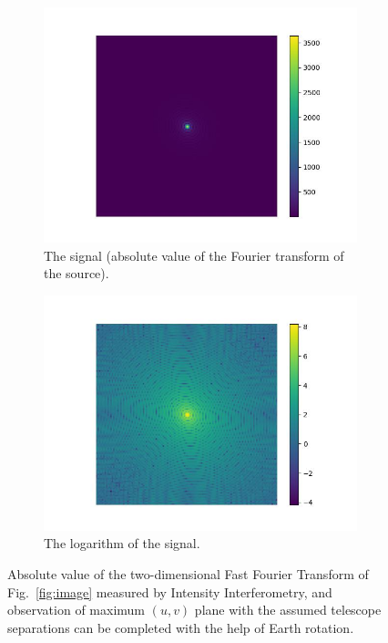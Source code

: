\begin{figure}
	\centering
	\begin{subfigure}{0.5\linewidth}
		\includegraphics[width=\linewidth]{fig/ft/ft.jpg}
		\caption{The signal (absolute value of the Fourier transform of the source).}
	\end{subfigure}\hfill
	\begin{subfigure}{0.5\linewidth}
		\includegraphics[width=\linewidth]{fig/ft/ft_log.jpg}
		\caption{The logarithm of the signal.}
	\end{subfigure}
	\caption{Absolute value of the two-dimensional Fast Fourier Transform of Fig.~\ref{fig:image} measured by Intensity Interferometry, and observation of maximum $(u, v)$ plane with the assumed telescope separations can be completed with the help of Earth rotation.}
	\label{fig:ft}
\end{figure}
